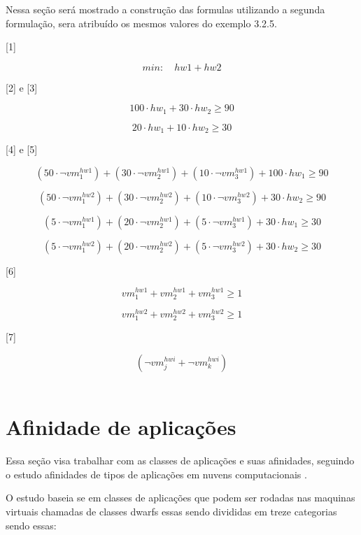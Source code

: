 Nessa seção será mostrado a construção das formulas utilizando a segunda formulação, sera atribuído os mesmos valores do exemplo 3.2.5.

[1]

$$min: \quad hw1 + hw2 $$

[2] e [3]

$$100 \cdot hw_1 + 30 \cdot hw_2 \geq 90$$ 


$$20 \cdot hw_1 + 10 \cdot hw_2 \geq 30$$ 


[4] e [5]

$$ (50 \cdot \lnot{vm_1^{hw1}}) + (30  \cdot \lnot{vm_2^{hw1}}) + (10  \cdot \lnot{vm_3^{hw1}}) + 100 \cdot hw_1 \geq 90 $$ 

$$ (50 \cdot \lnot{vm_1^{hw2}}) + (30  \cdot \lnot{vm_2^{hw2}}) + (10  \cdot \lnot{vm_3^{hw2}}) + 30 \cdot hw_2 \geq 90 $$ 


$$ (5 \cdot \lnot{vm_1^{hw1}}) + (20  \cdot \lnot{vm_2^{hw1}}) + (5  \cdot \lnot{vm_3^{hw1}}) + 30 \cdot hw_1 \geq 30 $$ 


$$ (5 \cdot \lnot{vm_1^{hw2}}) + (20  \cdot \lnot{vm_2^{hw2}}) + (5  \cdot \lnot{vm_3^{hw2}}) + 30 \cdot hw_2 \geq 30 $$

[6]

$$ vm_1^{hw1} + vm_2^{hw1} + vm_3^{hw1} \geq 1 $$


$$ vm_1^{hw2} + vm_2^{hw2} + vm_3^{hw2} \geq 1 $$

[7]

$$(\lnot{vm^{hwi}_j} + \lnot{vm_k^{hwi}})$$\

\section{Afinidade de aplicações}

Essa seção visa trabalhar com as classes de aplicações e suas afinidades, seguindo o estudo afinidades de tipos de aplicações em nuvens computacionais \cite{fabio2014}.

O estudo baseia se em classes de aplicações que podem ser rodadas nas maquinas virtuais chamadas de classes dwarfs essas sendo divididas em treze categorias sendo essas:

